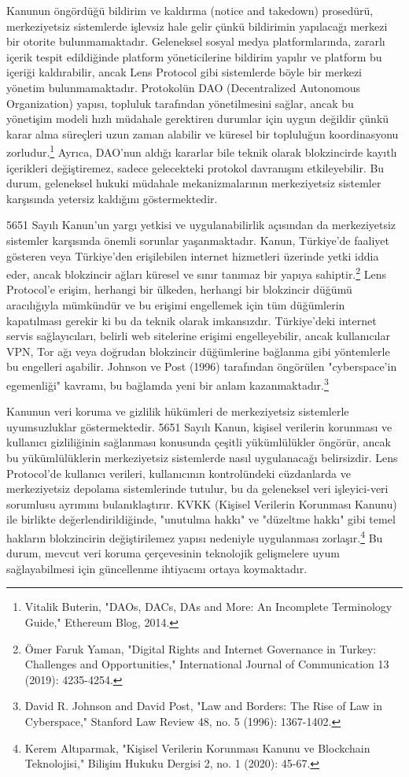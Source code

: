 \documentclass[11pt,a4paper]{article}
\begin{document}
Kanunun öngördüğü bildirim ve kaldırma (notice and takedown) prosedürü, merkeziyetsiz sistemlerde işlevsiz hale gelir çünkü bildirimin yapılacağı merkezi bir otorite bulunmamaktadır. Geleneksel sosyal medya platformlarında, zararlı içerik tespit edildiğinde platform yöneticilerine bildirim yapılır ve platform bu içeriği kaldırabilir, ancak Lens Protocol gibi sistemlerde böyle bir merkezi yönetim bulunmamaktadır. Protokolün DAO (Decentralized Autonomous Organization) yapısı, topluluk tarafından yönetilmesini sağlar, ancak bu yönetişim modeli hızlı müdahale gerektiren durumlar için uygun değildir çünkü karar alma süreçleri uzun zaman alabilir ve küresel bir topluluğun koordinasyonu zorludur.\footnote{Vitalik Buterin, "DAOs, DACs, DAs and More: An Incomplete Terminology Guide," Ethereum Blog, 2014.} Ayrıca, DAO'nun aldığı kararlar bile teknik olarak blokzincirde kayıtlı içerikleri değiştiremez, sadece gelecekteki protokol davranışını etkileyebilir. Bu durum, geleneksel hukuki müdahale mekanizmalarının merkeziyetsiz sistemler karşısında yetersiz kaldığını göstermektedir.

5651 Sayılı Kanun'un yargı yetkisi ve uygulanabilirlik açısından da merkeziyetsiz sistemler karşısında önemli sorunlar yaşanmaktadır. Kanun, Türkiye'de faaliyet gösteren veya Türkiye'den erişilebilen internet hizmetleri üzerinde yetki iddia eder, ancak blokzincir ağları küresel ve sınır tanımaz bir yapıya sahiptir.\footnote{Ömer Faruk Yaman, "Digital Rights and Internet Governance in Turkey: Challenges and Opportunities," International Journal of Communication 13 (2019): 4235-4254.} Lens Protocol'e erişim, herhangi bir ülkeden, herhangi bir blokzincir düğümü aracılığıyla mümkündür ve bu erişimi engellemek için tüm düğümlerin kapatılması gerekir ki bu da teknik olarak imkansızdır. Türkiye'deki internet servis sağlayıcıları, belirli web sitelerine erişimi engelleyebilir, ancak kullanıcılar VPN, Tor ağı veya doğrudan blokzincir düğümlerine bağlanma gibi yöntemlerle bu engelleri aşabilir. Johnson ve Post (1996) tarafından öngörülen "cyberspace'in egemenliği" kavramı, bu bağlamda yeni bir anlam kazanmaktadır.\footnote{David R. Johnson and David Post, "Law and Borders: The Rise of Law in Cyberspace," Stanford Law Review 48, no. 5 (1996): 1367-1402.}

Kanunun veri koruma ve gizlilik hükümleri de merkeziyetsiz sistemlerle uyumsuzluklar göstermektedir. 5651 Sayılı Kanun, kişisel verilerin korunması ve kullanıcı gizliliğinin sağlanması konusunda çeşitli yükümlülükler öngörür, ancak bu yükümlülüklerin merkeziyetsiz sistemlerde nasıl uygulanacağı belirsizdir. Lens Protocol'de kullanıcı verileri, kullanıcının kontrolündeki cüzdanlarda ve merkeziyetsiz depolama sistemlerinde tutulur, bu da geleneksel veri işleyici-veri sorumlusu ayrımını bulanıklaştırır. KVKK (Kişisel Verilerin Korunması Kanunu) ile birlikte değerlendirildiğinde, "unutulma hakkı" ve "düzeltme hakkı" gibi temel hakların blokzincirin değiştirilemez yapısı nedeniyle uygulanması zorlaşır.\footnote{Kerem Altıparmak, "Kişisel Verilerin Korunması Kanunu ve Blockchain Teknolojisi," Bilişim Hukuku Dergisi 2, no. 1 (2020): 45-67.} Bu durum, mevcut veri koruma çerçevesinin teknolojik gelişmelere uyum sağlayabilmesi için güncellenme ihtiyacını ortaya koymaktadır.
\end{document}

